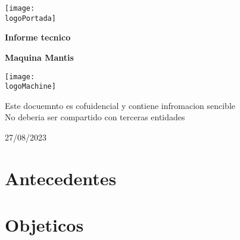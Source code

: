 \documentclass[a4paper]{article}
\newcommand{\logoPortada}{../images/upc.png}
\newcommand{\logoMachine}{../images/mantis.png}
\newcommand{\machineName}{Mantis}
\newcommand{\startDate}{27/08/2023}
\begin{document}
    \begin{titlepage}
        \centering
        \texttt{[image: \\logoPortada]}
        \par\vspace{1cm}
        {\LARGE\textbf{Informe tecnico}}
        \par\vspace{0.4cm}
        {\Huge\bfseries\textcolor{greenPortada}{Maquina \machineName}}
        \vfill

        \par\vspace{0.4cm}
        \texttt{[image: \\logoMachine]}
        \vfill

        \par\vspace{1cm}
        \begin{tcolorbox}[colback=red!5!white,colframe=red!75!black]
            \centering
            Este docuemnto es cofuidencial y contiene infromacion sencible
            \\
            No deberia ser compartido con terceras entidades
        \end{tcolorbox}
        \vfill

        {\large\startDate\par}

    \end{titlepage}
    \clearpage

    \tableofcontents
    \cfoot{\thepage}
    \clearpage
    \section{Antecedentes}
    \section{Objeticos}
\end{document}
